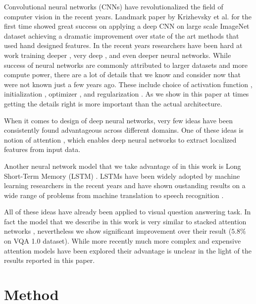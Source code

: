 \documentclass[10pt,twocolumn,letterpaper]{article}
\begin{document}
Convolutional neural networks (CNNs) \cite{LeCun2010ConvolutionalNA} have revolutionalized the field of computer vision in the recent years. Landmark paper by Krizhevsky et al. \cite{Krizhevsky2012ImageNetCW} for the first time showed great success on applying a deep CNN on large scale ImageNet \cite{Deng2009ImageNetAL} dataset achieving a dramatic improvement over state of the art methods that used hand designed features. In the recent years researchers have been hard at work training deeper \cite{Szegedy2015GoingDW}, very deep \cite{Szegedy2016RethinkingTI}, and even deeper \cite{He2016DeepRL} neural networks. While success of neural networks are commonly attributed to larger datasets and more compute power, there are a lot of details that we know and consider now that were not known just a few years ago. These include choice of activation function \cite{Nair2010RectifiedLU}, initialization \cite{Glorot2010UnderstandingTD}, optimizer \cite{Kingma2014AdamAM}, and regularization \cite{Hinton2012ImprovingNN}. As we show in this paper at times getting the details right is more important than the actual architecture.

When it comes to design of deep neural networks, very few ideas have been consistently found advantageous across different domains. One of these ideas is notion of attention \cite{Mnih2014RecurrentMO,Vinyals2015ShowAT}, which enables deep neural networks to extract localized features from input data.

Another neural network model that we take advantage of in this work is Long Short-Term Memory (LSTM) \cite{Hochreiter1997LongSM}. LSTMs have been widely adopted by machine learning researchers in the recent years and have shown oustanding results on a wide range of problems from machine translation \cite{Bahdanau2014NeuralMT} to speech recognition \cite{Sak2014LongSM}.

All of these ideas have already been applied to visual question answering task. In fact the model that we describe in this work is very similar to stacked attention networks \cite{Yang2016StackedAN}, nevertheless we show significant improvement over their result ($5.8\%$ on VQA 1.0 dataset). While more recently much more complex and expensive attention models have been explored \cite{Fukui2016MultimodalCB,Nam2016DualAN,Lu2016HierarchicalQC} their advantage is unclear in the light of the results reported in this paper. 

\section{Method}
\end{document}
